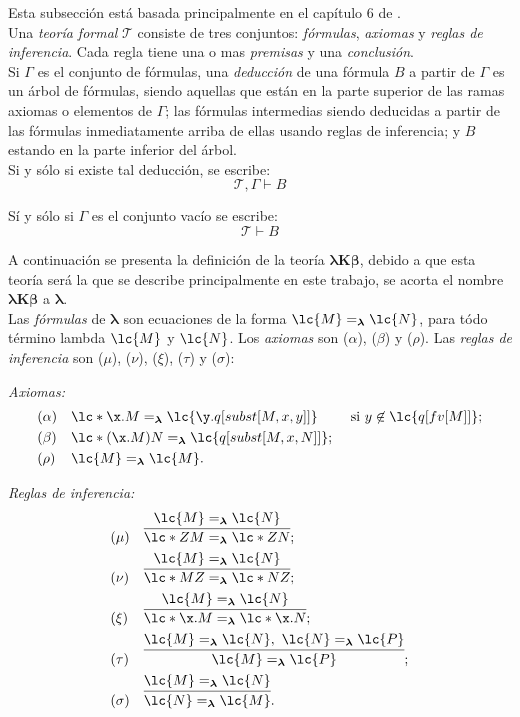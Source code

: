 Esta subsección está basada principalmente en el capítulo 6 de
\cite{HindleySeldin:LambdaCalculusAndCombinators}. \\

Una \emph{teoría formal} \(\mathcal{T}\) consiste de tres conjuntos:
\emph{fórmulas}, \emph{axiomas} y \emph{reglas de inferencia}. Cada regla
tiene una o mas \emph{premisas} y una \emph{conclusión}. \\

Si \(\Gamma\) es el conjunto de fórmulas, una \emph{deducción} de una fórmula
\(B\) a partir de \(\Gamma\) es un árbol de fórmulas, siendo aquellas que están
en la parte superior de las ramas axiomas o elementos de \(\Gamma\); las
fórmulas intermedias siendo deducidas a partir de las fórmulas inmediatamente
arriba de ellas usando reglas de inferencia; y \(B\) estando en la parte
inferior del árbol. \\

Si y sólo si existe tal deducción, se escribe:
\[\mathcal{T},\Gamma \vdash B\]

Sí y sólo si \(\Gamma\) es el conjunto vacío se escribe:
\[\mathcal{T} \vdash B\]

A continuación se presenta la definición de la teoría \(\boldsymbol{\lambda K
  \beta}\), debido a que esta teoría será la que se describe principalmente en
este trabajo, se acorta el nombre \(\boldsymbol{\lambda K \beta}\) a
\(\boldsymbol{\lambda}\). \\

Las \emph{fórmulas} de \(\boldsymbol{\lambda}\) son ecuaciones de la
forma \(\lc{M}=_{\boldsymbol{\lambda}}\lc{N}\), para tódo término lambda
\(\lc{M}\) y \(\lc{N}\). Los \emph{axiomas} son (\(\alpha\)), (\(\beta\)) y
(\(\rho\)). Las \emph{reglas de inferencia} son (\(\mu\)), (\(\nu\)), (\(\xi\)),
(\(\tau\)) y (\(\sigma\)):

\emph{Axiomas:}
\begin{align*}
  &(\alpha) & & \lc*{\x.M}=_{\boldsymbol{\lambda}}\lc{\y.q[subst[M,x,y]]} & &\text{ si } y \not\in \lc{q[fv[M]]}; \\
  &(\beta)  & & \lc*{(\x.M)N}=_{\boldsymbol{\lambda}}\lc{q[subst[M,x,N]]}; \\
  &(\rho)   & & \lc{M}=_{\boldsymbol{\lambda}}\lc{M}.
\end{align*}

\emph{Reglas de inferencia:}
\begin{align*}
  &(\mu)    & & \infer{\lc*{Z M}=_{\boldsymbol{\lambda}}\lc*{Z N}}{\lc{M}=_{\boldsymbol{\lambda}}\lc{N}}; \\
  &(\nu)    & & \infer{\lc*{M Z}=_{\boldsymbol{\lambda}}\lc*{N Z}}{\lc{M}=_{\boldsymbol{\lambda}}\lc{N}}; \\
  &(\xi)    & & \infer{\lc*{\x.M}=_{\boldsymbol{\lambda}}\lc*{\x.N}}{\lc{M}=_{\boldsymbol{\lambda}}\lc{N}}; \\
  &(\tau)   & & \infer{\lc{M}=_{\boldsymbol{\lambda}}\lc{P}}{\lc{M}=_{\boldsymbol{\lambda}}\lc{N},\ \lc{N}=_{\boldsymbol{\lambda}}\lc{P}}; \\
  &(\sigma) & & \infer{\lc{N}=_{\boldsymbol{\lambda}}\lc{M}}{\lc{M}=_{\boldsymbol{\lambda}}\lc{N}}.
\end{align*}

